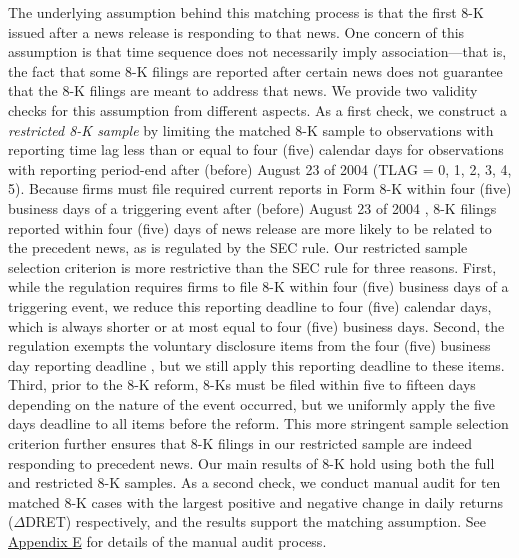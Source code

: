 \documentclass[a4paper]{article}
\begin{document}
\begin{spacing}{2}
The underlying assumption behind this matching process is that the first 8-K issued after a news release is responding to that news. One concern of this assumption is that time sequence does not necessarily imply association---that is, the fact that some 8-K filings are reported after certain news does not guarantee that the 8-K filings are meant to address that news. We provide two validity checks for this assumption from different aspects. As a first check, we construct a \textit{restricted 8-K sample} by limiting the matched 8-K sample to observations with reporting time lag less than or equal to four (five) calendar days for observations with reporting period-end after (before) August 23 of 2004 (TLAG = 0, 1, 2, 3, 4, 5). Because firms must file required current reports in Form 8-K within four (five) business days of a triggering event after (before) August 23 of 2004 \citep*{secFinalRuleAdditional2004}, 8-K filings reported within four (five) days of news release are more likely to be related to the precedent news, as is regulated by the SEC rule. Our restricted sample selection criterion is more restrictive than the SEC rule for three reasons. First, while the regulation requires firms to file 8-K within four (five) business days of a triggering event, we reduce this reporting deadline to four (five) calendar days, which is always shorter or at most equal to four (five) business days. Second, the regulation exempts the voluntary disclosure items from the four (five) business day reporting deadline \citep{heMeasuringDisclosureUsing2020}, but we still apply this reporting deadline to these items. Third, prior to the 8-K reform, 8-Ks must be filed within five to fifteen days depending on the nature of the event occurred, but we uniformly apply the five days deadline to all items before the reform. This more stringent sample selection criterion further ensures that 8-K filings in our restricted sample are indeed responding to precedent news. Our main results of 8-K hold using both the full and restricted 8-K samples. As a second check, we conduct manual audit for ten matched 8-K cases with the largest positive and negative change in daily returns ($\Delta$DRET) respectively, and the results support the matching assumption. See \hyperref[appe]{Appendix E} for details of the manual audit process.


\end{spacing}
\end{document}
